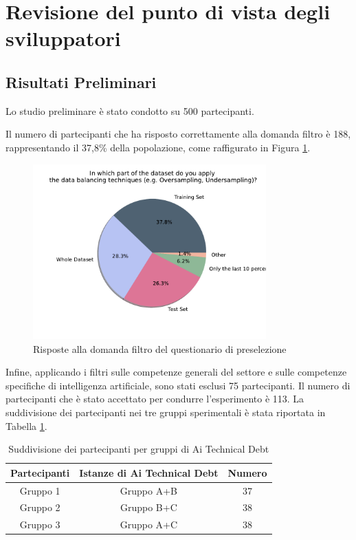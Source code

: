 \section{Revisione del punto di vista degli sviluppatori}
\subsection{Risultati Preliminari}

Lo studio preliminare è stato condotto su 500 partecipanti.

Il numero di partecipanti che ha risposto correttamente alla domanda filtro è 188, rappresentando il 37,8\% della popolazione, come raffigurato in Figura \ref{fig:pre_filter}.

\begin{figure}[h!]
    \centering
    \includegraphics[width=0.8\textwidth]{Figure/Results/SurveyResults/prescreening/prescreening_filter_pie.pdf}
    \caption{Risposte alla domanda filtro del questionario di preselezione}
    \label{fig:pre_filter}
\end{figure}

Infine, applicando i filtri sulle competenze generali del settore e sulle competenze specifiche di intelligenza artificiale, sono stati esclusi 75 partecipanti.
Il numero di partecipanti che è stato accettato per condurre l'esperimento è 113.
La suddivisione dei partecipanti nei tre gruppi sperimentali è stata riportata in Tabella \ref{tab:design_experiment_results}.
\begin{table}[h]
    \centering
    \begin{tabular}{|c|c|c|}
        \hline
        \textbf{Partecipanti} & \textbf{Istanze di Ai Technical Debt}  & \textbf{Numero}\\
        \hline
        Gruppo 1 & Gruppo A+B & 37 \\
        Gruppo 2 & Gruppo B+C & 38\\
        Gruppo 3 & Gruppo A+C & 38\\
        \hline
    \end{tabular}
    \caption{Suddivisione dei partecipanti per gruppi di Ai Technical Debt}
    \label{tab:design_experiment_results}
\end{table}

